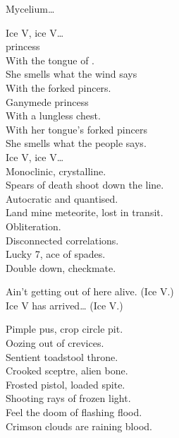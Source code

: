 Mycelium… \\





Ice V, ice V… \\

 princess \\
With the tongue of . \\
She smells what the wind says \\
With the  forked pincers. \\

Ganymede princess \\
With a lungless chest. \\
With her tongue's forked pincers \\
She smells what the people says. \\

Ice V, ice V… \\

Monoclinic, crystalline. \\
Spears of death shoot down the line. \\
Autocratic and quantised. \\
Land mine meteorite, lost in transit. \\
Obliteration. \\
Disconnected correlations. \\
Lucky 7, ace of spades. \\
Double down, checkmate. \\


Ain't getting out of here alive. (Ice V.) \\
Ice V has arrived… (Ice V.) \\


Pimple pus, crop circle pit. \\
Oozing out of crevices. \\
Sentient toadstool throne. \\
Crooked sceptre, alien bone. \\
Frosted pistol, loaded spite. \\
Shooting rays of frozen light. \\
Feel the doom of flashing flood. \\
Crimson clouds are raining blood. \\

